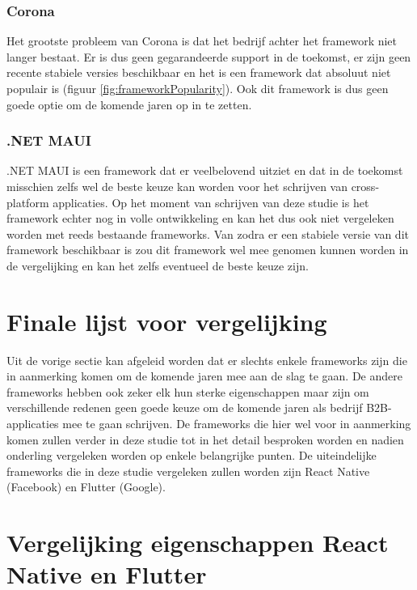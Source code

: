 \subsubsection{Corona}
\label{subsubsec:CoronaEisen}

Het grootste probleem van Corona is dat het bedrijf achter het framework niet langer bestaat. Er is dus geen gegarandeerde support in de toekomst, er zijn geen recente stabiele versies beschikbaar en het is een framework dat absoluut niet populair is (figuur \ref{fig:frameworkPopularity}). Ook dit framework is dus geen goede optie om de komende jaren op in te zetten.

\subsubsection{.NET MAUI}
\label{subsubsec:.NETMAUIEisen}

.NET MAUI is een framework dat er veelbelovend uitziet en dat in de toekomst misschien zelfs wel de beste keuze kan worden voor het schrijven van cross-platform applicaties. Op het moment van schrijven van deze studie is het framework echter nog in volle ontwikkeling en kan het dus ook niet vergeleken worden met reeds bestaande frameworks. Van zodra er een stabiele versie van dit framework beschikbaar is zou dit framework wel mee genomen kunnen worden in de vergelijking en kan het zelfs eventueel de beste keuze zijn.

\section{Finale lijst voor vergelijking}
\label{sec:finaleLijst}

Uit de vorige sectie kan afgeleid worden dat er slechts enkele frameworks zijn die in aanmerking komen om de komende jaren mee aan de slag te gaan. De andere frameworks hebben ook zeker elk hun sterke eigenschappen maar zijn om verschillende redenen geen goede keuze om de komende jaren als bedrijf B2B-applicaties mee te gaan schrijven. De frameworks die hier wel voor in aanmerking komen zullen verder in deze studie tot in het detail besproken worden en nadien onderling vergeleken worden op enkele belangrijke punten. De uiteindelijke frameworks die in deze studie vergeleken zullen worden zijn React Native (Facebook) en Flutter (Google).


\section{Vergelijking eigenschappen React Native en Flutter}
\label{sec:vglEigenschappen}

